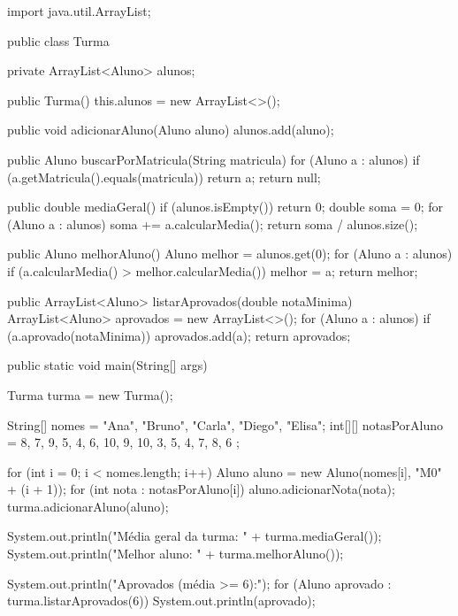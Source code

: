 \documentclass[11pt,a4paper]{article}
\begin{document}
\begin{javacode}
import java.util.ArrayList;

public class Turma {
    private ArrayList<Aluno> alunos;

    public Turma() {
        this.alunos = new ArrayList<>();
    }

    public void adicionarAluno(Aluno aluno) {
        alunos.add(aluno);
    }

    public Aluno buscarPorMatricula(String matricula) {
        for (Aluno a : alunos) {
            if (a.getMatricula().equals(matricula)) {
                return a;
            }
        }
        return null;
    }

    public double mediaGeral() {
        if (alunos.isEmpty()) return 0;
        double soma = 0;
        for (Aluno a : alunos) {
            soma += a.calcularMedia();
        }
        return soma / alunos.size();
    }

    public Aluno melhorAluno() {
        Aluno melhor = alunos.get(0);
        for (Aluno a : alunos) {
            if (a.calcularMedia() > melhor.calcularMedia()) {
                melhor = a;
            }
        }
        return melhor;
    }

    public ArrayList<Aluno> listarAprovados(double notaMinima) {
        ArrayList<Aluno> aprovados = new ArrayList<>();
        for (Aluno a : alunos) {
            if (a.aprovado(notaMinima)) {
                aprovados.add(a);
            }
        }
        return aprovados;
    }

    public static void main(String[] args) {
        Turma turma = new Turma();

        String[] nomes = {"Ana", "Bruno", "Carla", "Diego", "Elisa"};
        int[][] notasPorAluno = {
            {8, 7, 9},
            {5, 4, 6},
            {10, 9, 10},
            {3, 5, 4},
            {7, 8, 6}
        };

        for (int i = 0; i < nomes.length; i++) {
            Aluno aluno = new Aluno(nomes[i], "M0" + (i + 1));
            for (int nota : notasPorAluno[i]) {
                aluno.adicionarNota(nota);
            }
            turma.adicionarAluno(aluno);
        }

        System.out.println("Média geral da turma: " + turma.mediaGeral());
        System.out.println("Melhor aluno: " + turma.melhorAluno());

        System.out.println("Aprovados (média >= 6):");
        for (Aluno aprovado : turma.listarAprovados(6)) {
            System.out.println(aprovado);
        }
    }
}
\end{javacode}
\end{document}
